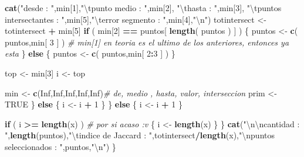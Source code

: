 \documentclass[]{article}
\newenvironment{Shaded}{\begin{snugshade}}{\end{snugshade}}
\newcommand{\KeywordTok}[1]{\textcolor[rgb]{0.13,0.29,0.53}{\textbf{#1}}}
\newcommand{\DecValTok}[1]{\textcolor[rgb]{0.00,0.00,0.81}{#1}}
\newcommand{\CharTok}[1]{\textcolor[rgb]{0.31,0.60,0.02}{#1}}
\newcommand{\StringTok}[1]{\textcolor[rgb]{0.31,0.60,0.02}{#1}}
\newcommand{\CommentTok}[1]{\textcolor[rgb]{0.56,0.35,0.01}{\textit{#1}}}
\newcommand{\OtherTok}[1]{\textcolor[rgb]{0.56,0.35,0.01}{#1}}
\newcommand{\ControlFlowTok}[1]{\textcolor[rgb]{0.13,0.29,0.53}{\textbf{#1}}}
\newcommand{\OperatorTok}[1]{\textcolor[rgb]{0.81,0.36,0.00}{\textbf{#1}}}
\newcommand{\NormalTok}[1]{#1}
\begin{document}
\begin{Shaded}
\begin{Highlighting}[]
        \KeywordTok{cat}\NormalTok{(}\StringTok{"desde : "}\NormalTok{,min[}\DecValTok{1}\NormalTok{],}\StringTok{"}\CharTok{\textbackslash{}t}\StringTok{punto medio : "}\NormalTok{,min[}\DecValTok{2}\NormalTok{], }\StringTok{"}\CharTok{\textbackslash{}t}\StringTok{hasta : "}\NormalTok{,min[}\DecValTok{3}\NormalTok{], }\StringTok{"}\CharTok{\textbackslash{}t}\StringTok{puntos intersectantes : "}\NormalTok{,min[}\DecValTok{5}\NormalTok{],}\StringTok{"}\CharTok{\textbackslash{}t}\StringTok{error segmento : "}\NormalTok{,min[}\DecValTok{4}\NormalTok{],}\StringTok{"}\CharTok{\textbackslash{}n}\StringTok{"}\NormalTok{)}
\NormalTok{        totintersect <-}\StringTok{ }\NormalTok{totintersect }\OperatorTok{+}\StringTok{ }\NormalTok{min[}\DecValTok{5}\NormalTok{]}
        \ControlFlowTok{if}\NormalTok{ ( min[}\DecValTok{2}\NormalTok{] }\OperatorTok{==}\StringTok{ }\NormalTok{puntos[ }\KeywordTok{length}\NormalTok{( puntos ) ] ) }
\NormalTok{        \{}
\NormalTok{          puntos <-}\StringTok{ }\KeywordTok{c}\NormalTok{( puntos,min[ }\DecValTok{3}\NormalTok{ ] ) }\CommentTok{# min[1] en teoria es el ultimo de los anteriores, entonces ya esta }
\NormalTok{        \}}
        \ControlFlowTok{else}
\NormalTok{        \{}
\NormalTok{          puntos <-}\StringTok{ }\KeywordTok{c}\NormalTok{( puntos,min[ }\DecValTok{2}\OperatorTok{:}\DecValTok{3}\NormalTok{ ] )}
\NormalTok{        \}}
        
\NormalTok{        top <-}\StringTok{ }\NormalTok{min[}\DecValTok{3}\NormalTok{]}
\NormalTok{        i   <-}\StringTok{ }\NormalTok{top}
        
\NormalTok{        min  <-}\StringTok{ }\KeywordTok{c}\NormalTok{(}\OtherTok{Inf}\NormalTok{,}\OtherTok{Inf}\NormalTok{,}\OtherTok{Inf}\NormalTok{,}\OtherTok{Inf}\NormalTok{,}\OtherTok{Inf}\NormalTok{)}\CommentTok{# de, medio , hasta, valor, interseccion}
\NormalTok{        prim <-}\StringTok{ }\OtherTok{TRUE}
\NormalTok{      \}}
      \ControlFlowTok{else} 
\NormalTok{      \{}
\NormalTok{        i <-}\StringTok{ }\NormalTok{i }\OperatorTok{+}\StringTok{ }\DecValTok{1}  
\NormalTok{      \}}
\NormalTok{    \}}
    \ControlFlowTok{else} 
\NormalTok{    \{}
\NormalTok{      i <-}\StringTok{ }\NormalTok{i }\OperatorTok{+}\StringTok{ }\DecValTok{1}  
\NormalTok{    \}}
    
    \ControlFlowTok{if}\NormalTok{ ( i }\OperatorTok{>=}\StringTok{ }\KeywordTok{length}\NormalTok{(x) ) }\CommentTok{# por si acaso :v }
\NormalTok{    \{}
\NormalTok{      i <-}\StringTok{ }\KeywordTok{length}\NormalTok{(x)}
\NormalTok{    \}}
\NormalTok{  \}}
  \KeywordTok{cat}\NormalTok{(}\StringTok{"}\CharTok{\textbackslash{}n\textbackslash{}n}\StringTok{cantidad : "}\NormalTok{,}\KeywordTok{length}\NormalTok{(puntos),}\StringTok{"}\CharTok{\textbackslash{}t}\StringTok{indice de Jaccard : "}\NormalTok{,totintersect}\OperatorTok{/}\KeywordTok{length}\NormalTok{(x),}\StringTok{"}\CharTok{\textbackslash{}n}\StringTok{puntos seleccionados : "}\NormalTok{,puntos,}\StringTok{"}\CharTok{\textbackslash{}n}\StringTok{"}\NormalTok{)}
\NormalTok{\}}


\end{Highlighting}
\end{Shaded}
\end{document}
